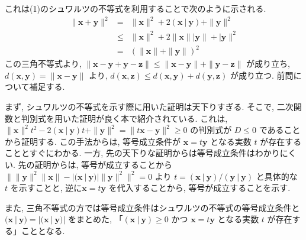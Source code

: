 \begin{nmprob}
{これは(1)のシュワルツの不等式を利用することで次のように示される.
\begin{eqnarray*}
    \|\bm{x} + \bm{y}\|^2 &=& \|\bm{x}\|^2 + 2(\bm{x}\ |\ \bm{y}) + \|\bm{y}\|^2\\
    &\leq& \|\bm{x}\|^2 + 2\|\bm{x}\||\bm{y}\| + |\bm{y}\|^2\\
    &=& (\|\bm{x}\| + \|\bm{y}\|)^2
\end{eqnarray*}
この三角不等式より, $\|\bm{x} - \bm{y} + \bm{y} - \bm{z}\| \leq \|\bm{x} -\bm{y}\| + \|\bm{y} - \bm{z}\|$ が成り立ち, $d(\bm{x}, \bm{y}) = \|\bm{x} - \bm{y}\|$ より, 
$d(\bm{x}, \bm{z}) \leq d(\bm{x}, \bm{y}) + d(\bm{y}, \bm{z})$ が成り立つ.
}
\newpage
前問について補足する.

まず, シュワルツの不等式を示す際に用いた証明は天下りすぎる. そこで, 二次関数と判別式を用いた証明が良く本で紹介されている.
これは, $\|\bm{x}\|^2t^2 - 2(\bm{x}\ |\ \bm{y})t + \|\bm{y}\|^2 = \| t\bm{x} - \bm{y}\|^2 \geq 0$ の判別式が $D \leq 0$ であることから証明する.
この手法からは, 等号成立条件が $\bm{x} = t\bm{y}$ となる実数 $t$ が存在することとすぐにわかる. 一方, 先の天下りな証明からは等号成立条件はわかりにくい.
先の証明からは, 等号が成立することから $\| \|\bm{y}\|^2\|\bm{x}\| - |(\bm{x}\ |\ \bm{y})| \|\bm{y}\|^2 \|^2 = 0$ より $t = (\bm{x}\ |\ \bm{y})/(\bm{y}\ |\ \bm{y})$ と具体的な $t$ を示すことと, 
逆に$\bm{x} = t\bm{y}$ を代入することから, 等号が成立することを示す. 

また, 三角不等式の方では等号成立条件はシュワルツの不等式の等号成立条件と $(\bm{x}\ |\ \bm{y}) = |(\bm{x}\ |\ \bm{y})|$ をまとめた, 
「$(\bm{x}\ |\ \bm{y}) \geq 0$ かつ $\bm{x} = t\bm{y}$ となる実数 $t$ が存在する」こととなる.
\end{nmprob}



